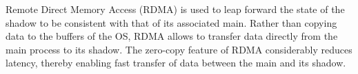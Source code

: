 
Remote Direct Memory Access (RDMA) is used to leap forward the state of the shadow to be consistent with that of its associated main. Rather than copying data to the buffers of the OS, RDMA allows to transfer data directly from the main process to its shadow. The zero-copy feature of RDMA considerably reduces latency, thereby enabling fast transfer of data between the main and its shadow.

 


